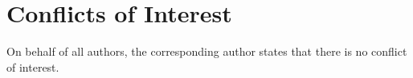 \documentclass[
      12pt,
        ]{article}
\begin{document}
\hypertarget{conflicts-of-interest}{%
\section{Conflicts of Interest}\label{conflicts-of-interest}}

On behalf of all authors, the corresponding author states that there is
no conflict of interest.
  \newpage 
  \theendnotes
\newpage
\singlespacing 
           
  
\end{document}
